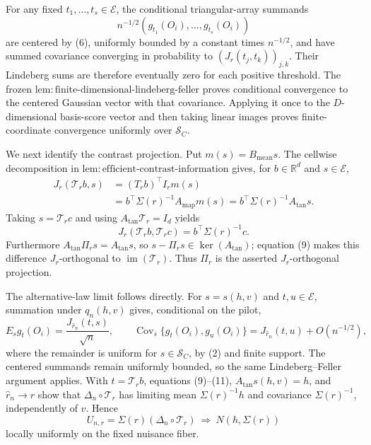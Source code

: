 For any fixed \(t_1,\ldots,t_s\in\mathcal E\), the conditional triangular-array summands
\[
 n^{-1/2}(g_{t_1}(O_i),\ldots,g_{t_s}(O_i))
\]
are centered by (6), uniformly bounded by a constant times \(n^{-1/2}\), and have summed covariance converging in probability to \((J_r(t_j,t_k))_{j,k}\).  Their Lindeberg sums are therefore eventually zero for each positive threshold.  The frozen \(\mathrm{lem:finite\text{-}dimensional\text{-}lindeberg\text{-}feller}\) proves conditional convergence to the centered Gaussian vector with that covariance.  Applying it once to the \(D\)-dimensional basis-score vector and then taking linear images proves finite-coordinate convergence uniformly over \(\mathcal S_C\).

We next identify the contrast projection.  Put \(m(s)=B_{\mathrm{mean}}s\).  The cellwise decomposition in \(\mathrm{lem:efficient\text{-}contrast\text{-}information}\) gives, for \(b\in\mathbb R^d\) and \(s\in\mathcal E\),
\[
 \begin{aligned}
 J_r(\mathcal T_rb,s)
 &=(T_rb)^\top I_rm(s)\\
 &=b^\top\Sigma(r)^{-1}A_{\mathrm{map}}m(s)
 =b^\top\Sigma(r)^{-1}A_{\mathrm{tan}}s.                            \tag{9}
 \end{aligned}
\]
Taking \(s=\mathcal T_rc\) and using \(A_{\mathrm{tan}}\mathcal T_r=I_d\) yields
\[
 J_r(\mathcal T_rb,\mathcal T_rc)=b^\top\Sigma(r)^{-1}c.             \tag{10}
\]
Furthermore \(A_{\mathrm{tan}}\Pi_rs=A_{\mathrm{tan}}s\), so \(s-\Pi_rs\in\ker(A_{\mathrm{tan}})\); equation (9) makes this difference \(J_r\)-orthogonal to \(\operatorname{im}(\mathcal T_r)\).  Thus \(\Pi_r\) is the asserted \(J_r\)-orthogonal projection.

The alternative-law limit follows directly.  For \(s=s(h,v)\) and \(t,u\in\mathcal E\), summation under \(q_n(h,v)\) gives, conditional on the pilot,
\[
 E_sg_t(O_i)=\frac{J_{\widehat r_n}(t,s)}{\sqrt n},\qquad
 \operatorname{Cov}_s\{g_t(O_i),g_u(O_i)\}
 =J_{\widehat r_n}(t,u)+O(n^{-1/2}),                                 \tag{11}
\]
where the remainder is uniform for \(s\in\mathcal S_C\), by (2) and finite support.  The centered summands remain uniformly bounded, so the same Lindeberg--Feller argument applies.  With \(t=\mathcal T_rb\), equations (9)--(11), \(A_{\mathrm{tan}}s(h,v)=h\), and \(\widehat r_n\to r\) show that \(\Delta_n\circ\mathcal T_r\) has limiting mean \(\Sigma(r)^{-1}h\) and covariance \(\Sigma(r)^{-1}\), independently of \(v\).  Hence
\[
 U_{n,r}=\Sigma(r)(\Delta_n\circ\mathcal T_r)
 \ \Rightarrow\ N(h,\Sigma(r))                                    \tag{12}
\]
locally uniformly on the fixed nuisance fiber.

